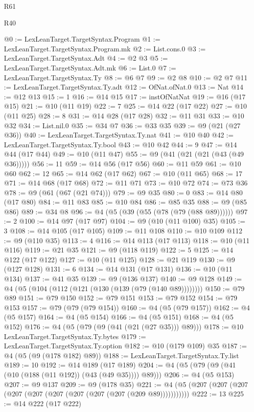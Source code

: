 \begin{lexlean}{R61}
\begin{lexlean}{R40}
\begin{coremodule}
{{{{{{{{{{{{{{{{{{{{{{{{{{{{{{{{{{{{{{{{{{{{{{{{{{{{{{{{{{{{{{{{{{{{{{{{{{{{{{{{{{{{{{{{{{{{{{{{{{{{{{{{{{{{{@0 := LexLeanTarget.TargetSyntax.Program
@1 := LexLeanTarget.TargetSyntax.Program.mk
@2 := List.cons.{0}
@3 := LexLeanTarget.TargetSyntax.Adt
@4 := @2 @3
@5 := LexLeanTarget.TargetSyntax.Adt.mk
@6 := List.{0}
@7 := LexLeanTarget.TargetSyntax.Ty
@8 := @6 @7
@9 := @2 @8
@10 := @2 @7
@11 := LexLeanTarget.TargetSyntax.Ty.adt
@12 := OfNat.ofNat.{0}
@13 := Nat
@14 := @12 @13
@15 := 1
@16 := @14 @15
@17 := instOfNatNat
@19 := @16 (@17 @15)
@21 := @10 (@11 @19)
@22 := 7
@25 := @14 @22 (@17 @22)
@27 := @10 (@11 @25)
@28 := 8
@31 := @14 @28 (@17 @28)
@32 := @11 @31
@33 := @10 @32
@34 := List.nil.{0}
@35 := @34 @7
@36 := @33 @35
@39 := @9 (@21 (@27 @36))
@40 := LexLeanTarget.TargetSyntax.Ty.nat
@41 := @10 @40
@42 := LexLeanTarget.TargetSyntax.Ty.bool
@43 := @10 @42
@44 := 9
@47 := @14 @44 (@17 @44)
@49 := @10 (@11 @47)
@55 := @9 (@41 (@21 (@21 (@43 (@49 @36)))))
@56 := 11
@59 := @14 @56 (@17 @56)
@60 := @11 @59
@61 := @10 @60
@62 := 12
@65 := @14 @62 (@17 @62)
@67 := @10 (@11 @65)
@68 := 17
@71 := @14 @68 (@17 @68)
@72 := @11 @71
@73 := @10 @72
@74 := @73 @36
@78 := @9 (@61 (@67 (@21 @74)))
@79 := @9 @35
@80 := 0
@83 := @14 @80 (@17 @80)
@84 := @11 @83
@85 := @10 @84
@86 := @85 @35
@88 := @9 (@85 @86)
@89 := @34 @8
@96 := @4 (@5 (@39 (@55 (@78 (@79 (@88 @89))))))
@97 := 2
@100 := @14 @97 (@17 @97)
@104 := @9 (@10 (@11 @100) @35)
@105 := 3
@108 := @14 @105 (@17 @105)
@109 := @11 @108
@110 := @10 @109
@112 := @9 (@110 @35)
@113 := 4
@116 := @14 @113 (@17 @113)
@118 := @10 (@11 @116)
@119 := @21 @35
@121 := @9 (@118 @119)
@122 := 5
@125 := @14 @122 (@17 @122)
@127 := @10 (@11 @125)
@128 := @21 @119
@130 := @9 (@127 @128)
@131 := 6
@134 := @14 @131 (@17 @131)
@136 := @10 (@11 @134)
@137 := @41 @35
@139 := @9 (@136 @137)
@140 := @9 @128
@149 := @4 (@5 (@104 (@112 (@121 (@130 (@139 (@79 (@140 @89))))))))
@150 := @79 @89
@151 := @79 @150
@152 := @79 @151
@153 := @79 @152
@154 := @79 @153
@157 := @79 (@79 (@79 @154))
@160 := @4 (@5 (@79 @157))
@162 := @4 (@5 @157)
@164 := @4 (@5 @154)
@166 := @4 (@5 @151)
@168 := @4 (@5 @152)
@176 := @4 (@5 (@79 (@9 (@41 (@21 (@27 @35))) @89)))
@178 := @10 LexLeanTarget.TargetSyntax.Ty.bytes
@179 := LexLeanTarget.TargetSyntax.Ty.option
@182 := @10 (@179 @109) @35
@187 := @4 (@5 (@9 (@178 @182) @89))
@188 := LexLeanTarget.TargetSyntax.Ty.list
@189 := 10
@192 := @14 @189 (@17 @189)
@204 := @4 (@5 (@79 (@9 (@41 (@10 (@188 (@11 @192)) (@43 (@49 @35)))) @89)))
@206 := @4 (@5 @153)
@207 := @9 @137
@209 := @9 (@178 @35)
@221 := @4 (@5 (@207 (@207 (@207 (@207 (@207 (@207 (@207 (@207 (@207 (@209 @89)))))))))))
@222 := 13
@225 := @14 @222 (@17 @222)
}}}}}}}}}}}}}}}}}}}}}}}}}}}}}}}}}}}}}}}}}}}}}}}}}}}}}}}}}}}}}}}}}}}}}}}}}}}}}}}}}}}}}}}}}}}}}}}}}}}}}}}}}}}}}
\end{coremodule}
\end{lexlean}
\end{lexlean}
